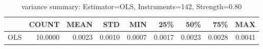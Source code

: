 \begin{table}[ht]
\centering
\caption{variance summary: Estimator=OLS, Instruments=142, Strength=0.80}
\begin{tabular}{lrrrrrrrr}
\toprule
 & COUNT & MEAN & STD & MIN & 25\% & 50\% & 75\% & MAX \\
\midrule
OLS & 10.0000 & 0.0023 & 0.0010 & 0.0007 & 0.0017 & 0.0023 & 0.0028 & 0.0041 \\
\bottomrule
\end{tabular}
\end{table}
